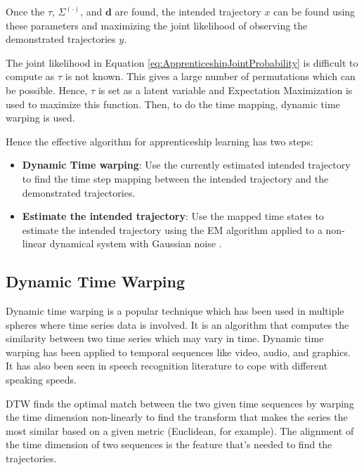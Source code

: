 \documentclass[hidelinks,BTech]{iitmdiss}
\begin{document}
Once the $\tau$, $\Sigma^{(\cdot)}$, and $\mathbf{d}$ are found, the intended trajectory $x$ can be found using these parameters and maximizing the joint likelihood of observing the demonstrated trajectories $y$.

The joint likelihood in Equation \ref{eq:ApprenticeshipJointProbability} is difficult to compute as $\tau$ is not known. This gives a large number of permutations which can be possible. Hence, $\tau$ is set as a latent variable and Expectation Maximization is used to maximize this function. Then, to do the time mapping, dynamic time warping \cite{DTW} is used.

Hence the effective algorithm for apprenticeship learning has two steps:
\begin{itemize}
\item{{\bf Dynamic Time warping}: Use the currently estimated intended trajectory to find the time step mapping between the intended trajectory and the demonstrated trajectories.}
\item{{\bf Estimate the intended trajectory}: Use the mapped time states to estimate the intended trajectory using the EM algorithm applied to a non-linear dynamical system with Gaussian noise \cite{NonLinearEMKalman}.}
\end{itemize}

\subsection{Dynamic Time Warping}

Dynamic time warping \cite{DTW} is a popular technique which has been used in multiple spheres where time series data is involved. It is an algorithm that computes the similarity between two time series which may vary in time. Dynamic time warping has been applied to temporal sequences like video, audio, and graphics. It has also been seen in speech recognition literature to cope with different speaking speeds.

DTW finds the optimal match between the two given time sequences by warping the time dimension non-linearly to find the transform that makes the series the most similar based on a given metric (Euclidean, for example). The alignment of the time dimension of two sequences is the feature that's needed to find the trajectories.
\end{document}
